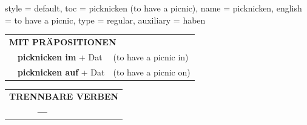 \begin{verbentry}{
  style = {default},
  toc = {picknicken (to have a picnic)},
  name = {picknicken},
  english = {to have a picnic},
  type = {regular},
  auxiliary = {haben}
}
\vspace{10pt}

\begin{tabular}{lll}
\multicolumn{3}{l}{\textbf{MIT PRÄPOSITIONEN}}\\
& \textbf{picknicken im} + Dat & (to have a picnic in)\\
& \textbf{picknicken auf} + Dat & (to have a picnic on)\\
\end{tabular}
\hfill
\begin{tabular}{lll}
\multicolumn{3}{l}{\textbf{TRENNBARE VERBEN}}\\
& \textbf{---} & \\
\end{tabular}

\vspace{-5pt}
\end{verbentry}

